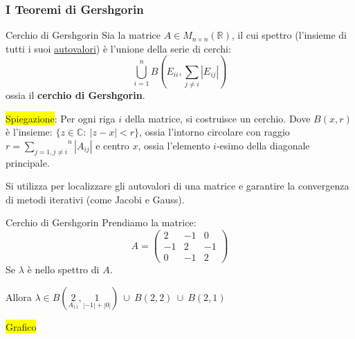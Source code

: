 \documentclass{article}
\begin{document}
\subsubsection{I Teoremi di Gershgorin}
\begin{defi}{Cerchio di Gershgorin}{}
    Sia la matrice $A\in M_{n\times n}(\mathbb R)$, il cui spettro (l'insieme di tutti i suoi \underline{autovalori}) è l'unione della serie di cerchi:
    \[\bigcup_{i=1}^{n} B\left( E_{ii}, \sum_{j \neq i} |E_{ij}| \right)\]
    ossia il \textbf{cerchio di Gershgorin}.
\end{defi}
\colorbox{yellow}{Spiegazione}: Per ogni riga $i$ della matrice, si costruisce un cerchio. Dove $B(x,r)$ è l'insieme: $\{z\in\mathbb C:\ |z-x|<r\}$,
ossia l'intorno circolare con raggio $r=\overset{n}{\underset{j=1,j\ne i}{\sum}}\left|A_{ij}\right|$ e centro $x$, ossia l'elemento $i$-esimo della diagonale principale.

Si utilizza per localizzare gli autovalori di una matrice e garantire la convergenza di metodi iterativi (come Jacobi e Gauss).

\begin{ex}{Cerchio di Gershgorin}{}
    Prendiamo la matrice: \[A=\begin{pmatrix}
            2  & -1 & 0  \\
            -1 & 2  & -1 \\
            0  & -1 & 2
        \end{pmatrix}\]
    Se $\lambda$ è nello spettro di $A$.
\end{ex}
Allora $\lambda\in B(\underset{A_{11}}{2},\underset{|-1|+|0|}{1})\ \cup\ B(2,2)\ \cup\ B(2,1)$
\newpage
\begin{center}
    \colorbox{yellow}{Grafico}

\end{center}
\end{document}
